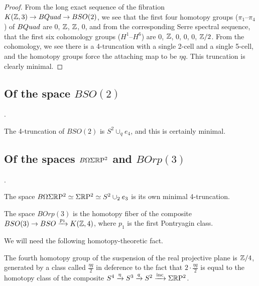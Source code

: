 \documentclass{amsart}
\begin{document}
\begin{proof}
From the long exact sequence of the fibration $K(\mathbb Z,3) \rightarrow BQuad \rightarrow BSO(2)$, we see that the first four homotopy groups ($\pi_1$--$\pi_4$) of $BQuad$ are $0$, $\mathbb Z$, $\mathbb Z$, $0$, and from the corresponding Serre spectral sequence, that the first six cohomology groups ($H^1$--$H^6$) are $0$, $\mathbb Z$, $0$, $0$, $0$, $\mathbb Z/2$.  From the cohomology, we see there is a 4-truncation with a single 2-cell and a single 5-cell, and the homotopy groups force the attaching map to be $\eta q$.  This truncation is clearly minimal.
\end{proof}

\subsection{Of the space $BSO(2)$}.

The 4-truncation of $BSO(2)$ is $S^2 \cup_q e_4$, and this is certainly minimal.

\subsection{Of the spaces $B \Omega \Sigma \mathbb R \mathrm{P}^2$ and $B Orp(3)$}.

The space $B \Omega \Sigma \mathbb R \mathrm{P}^2 \simeq \Sigma \mathbb R \mathrm{P}^2 \simeq S^2 \cup_2 e_3$ is its own minimal 4-truncation.

\begin{definition}
The space $BOrp(3)$ is the homotopy fiber of the composite $BSO(3) \rightarrow BSO \xrightarrow{p_1} K(\mathbb Z,4)$, where $p_1$ is the first Pontryagin class.
\end{definition}

We will need the following homotopy-theoretic fact.
\begin{proposition}
The fourth homotopy group of the suspension of the real projective plane is $\mathbb Z/4$, generated by a class called $\frac{\eta q}{2}$ in deference to the fact that $2 \cdot \frac{\eta q}{2}$ is equal to the homotopy class of the composite $S^4 \xrightarrow{\eta} S^3 \xrightarrow{q} S^2 \xrightarrow{\text{inc}} \Sigma \mathbb R \mathrm{P}^2$.
\end{proposition}
\end{document}
